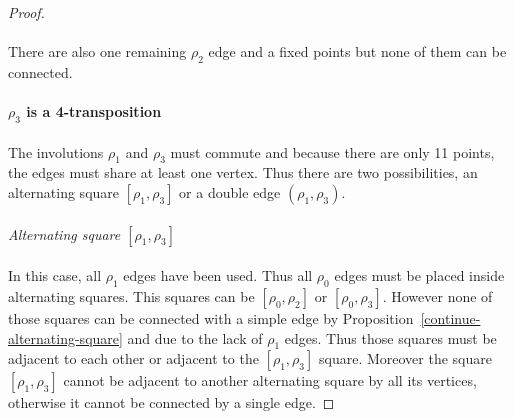 \begin{proof}
\begin{figure}[H]
\begin{center}
      \caption{}
    \end{center}
  \end{figure}

  \paragraph{}
  There are also one remaining $\rho_2$ edge and a fixed points but none of them can be connected.


  \paragraph{}
  \textbf{$\rho_3$ is a 4-transposition}

  \paragraph{}
  The involutions $\rho_1$ and $\rho_3$ must commute and because there are only 11 points, the edges must share at least one vertex. Thus there are two possibilities, an alternating square $[\rho_1, \rho_3]$ or a double edge $(\rho_1, \rho_3)$.

  \paragraph{}
  \textit{Alternating square $[\rho_1, \rho_3]$}

  \paragraph{}
  In this case, all $\rho_1$ edges have been used. Thus all $\rho_0$ edges must be placed inside alternating squares. This squares can be $[\rho_0, \rho_2]$ or $[\rho_0, \rho_3]$. However none of those squares can be connected with a simple edge by Proposition~\ref{continue-alternating-square} and due to the lack of $\rho_1$ edges. Thus those squares must be adjacent to each other or adjacent to the $[\rho_1, \rho_3]$ square. Moreover the square $[\rho_1, \rho_3]$ cannot be adjacent to another alternating square by all its vertices, otherwise it cannot be connected by a single edge.


\end{proof}
